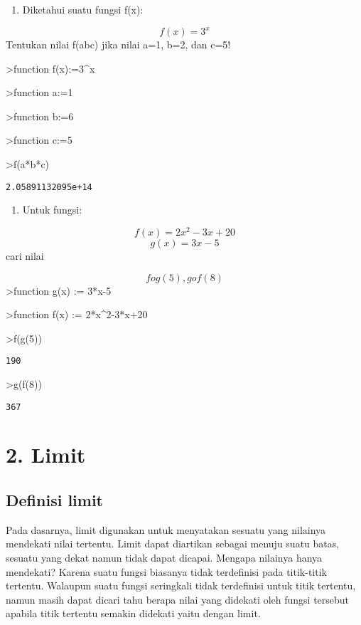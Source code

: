 \documentclass[
]{book}
\providecommand{\tightlist}{%
  \setlength{\itemsep}{0pt}\setlength{\parskip}{0pt}}
\begin{document}
\begin{enumerate}
\def\labelenumi{\arabic{enumi}.}
\setcounter{enumi}{3}
\tightlist
\item
  Diketahui suatu fungsi f(x):
\end{enumerate}

\[f(x)=3^x\]Tentukan nilai f(abc) jika nilai a=1, b=2, dan c=5!

\textgreater function f(x):=3\^{}x

\textgreater function a:=1

\textgreater function b:=6

\textgreater function c:=5

\textgreater f(a*b*c)

\begin{verbatim}
2.05891132095e+14
\end{verbatim}

\begin{enumerate}
\def\labelenumi{\arabic{enumi}.}
\setcounter{enumi}{4}
\tightlist
\item
  Untuk fungsi:
\end{enumerate}

\[f(x) = 2x^2-3x+20\]\[g(x)= 3x-5\]cari nilai

\[fog(5), gof(8)\]\textgreater function g(x) := 3*x-5

\textgreater function f(x) := 2*x\^{}2-3*x+20

\textgreater f(g(5))

\begin{verbatim}
190
\end{verbatim}

\textgreater g(f(8))

\begin{verbatim}
367
\end{verbatim}

\chapter{2. Limit}\label{limit}

\section{Definisi limit}\label{definisi-limit}

Pada dasarnya, limit digunakan untuk menyatakan sesuatu yang nilainya mendekati nilai tertentu. Limit dapat diartikan sebagai menuju suatu batas, sesuatu yang dekat namun tidak dapat dicapai. Mengapa nilainya hanya mendekati? Karena suatu fungsi biasanya tidak terdefinisi pada titik-titik tertentu. Walaupun suatu fungsi seringkali tidak terdefinisi untuk titik tertentu, namun masih dapat dicari tahu berapa nilai yang didekati oleh fungsi tersebut apabila titik tertentu semakin didekati yaitu dengan limit.
\end{document}
